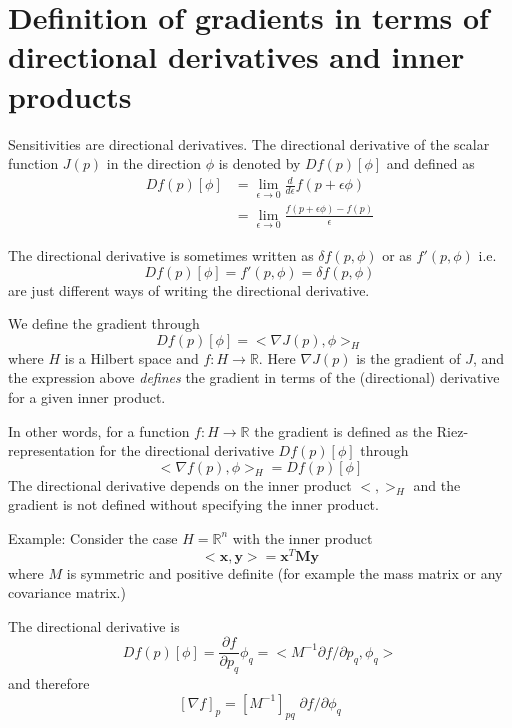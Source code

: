 \documentclass[10pt,a4paper]{book}
\newcommand{\p}{\partial}
\begin{document}
\chapter{Definition of gradients in terms of directional derivatives and inner products}
\label{sec:dder}
Sensitivities are directional derivatives. The directional derivative
of the scalar function $J(p)$ in the direction $\phi$
is denoted by $D f(p)[\phi]$ and defined as
\begin{align*}
 D f(p)[\phi] &= \lim_{\epsilon \to 0} \frac{d}{d \epsilon} f(p+\epsilon \phi)  \\
               &= \lim_{\epsilon \to 0}  \frac{f(p+\epsilon \phi)-f(p)}{\epsilon}
\end{align*}

The directional derivative is sometimes written as $\delta f(p,\phi)$
or as $f'(p,\phi)$ i.e.
\[
D f(p)[\phi]=f'(p,\phi)=\delta f(p,\phi)
\]
are just different ways of writing the directional derivative.

We define the gradient through 
\[
 D f(p)[\phi]  = < \nabla J(p), \phi >_H
\]
where $H$ is a Hilbert space and $f: H \to \mathbb{R}$. 
Here $\nabla J(p)$ is the gradient of $J$, and the expression above
{\em defines} the gradient in terms of the (directional) derivative
for a given inner product.

In other words, for a function $f:H \to \mathbb{R}$ the gradient is
defined as the Riez-representation for the directional derivative
$D f(p)[\phi]$ through
\[
< \nabla f (p) , \phi>_H= D f(p)[\phi] 
\]
The directional derivative depends on the inner product $< , >_H$ and
the gradient is not defined without specifying the inner product.

Example: Consider the case $H=\mathbb{R}^n$ with the inner product 
\[
<\bm{x},\bm{y}> = \bm{x}^T \bm{M} \bm{y}
\]
where $M$ is symmetric and positive definite (for example the mass
matrix or any covariance matrix.)

The directional derivative is
\[
D f(p)[\phi]=\frac{\p f}{\p p_q} \phi_q = < M^{-1} \p f / \p p_q, \phi_q> 
\]
and therefore 
\[
 [\nabla f]_p = [ M^{-1}]_{pq} \; \p f /\p \phi_q  
\] 
\end{document}
